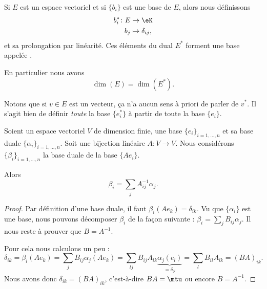 \begin{lemmaDef}      \label{DEFooTMSEooZFtsqa}
	Si \( E\) est un espace vectoriel et si \( \{ b_i \}\) est une base de \( E\), alors nous définissons
	\begin{equation}
		\begin{aligned}
			b_i^*\colon E & \to \eK              \\
			b_j           & \mapsto \delta_{ij},
		\end{aligned}
	\end{equation}
	et sa prolongation par linéarité. Ces éléments du dual \( E^*\) forment une base appelée .

	En particulier nous avons
	\begin{equation}
		\dim(E)=\dim(E^*).
	\end{equation}
\end{lemmaDef}
Notons que si \( v\in E\) est un vecteur, ça n'a aucun sens à priori de parler de \( v^*\). Il s'agit bien de définir \emph{toute} la base \( \{ e_i^* \}\) à partir de toute la base \( \{ e_i \}\).

\begin{lemma}		\label{LEMooSVRIooFbxfue}
	Soient un espace vectoriel \( V\) de dimension finie, une base \( \{ e_i \}_{i=1,\ldots,n}\) et sa base duale \( \{ \alpha_i \}_{i=1,\ldots,n}\). Soit une bijection linéaire \(A \colon V\to V  \). Nous considérons \( \{ \beta_i \}_{i=1,\ldots,n}\) la base duale de la base \( \{ Ae_i \}\).

	Alors
	\begin{equation}
		\beta_i=\sum_jA^{-1}_{ij}\alpha_j.
	\end{equation}
\end{lemma}

\begin{proof}

	Par définition d'une base duale, il faut \( \beta_i(Ae_k)=\delta_{ik}\). Vu que \( \{ \alpha_i \}\) est une base, nous pouvons décomposer \( \beta_i\) de la façon suivante : \( \beta_i=\sum_jB_{ij}\alpha_j\). Il nous reste à prouver que \( B=A^{-1}\).

	Pour cela nous calculons un peu :
	\begin{equation}
		\delta_{ik}=\beta_i(Ae_k)=\sum_jB_{ij}\alpha_j(Ae_k)=\sum_{lj}B_{ij}A_{lk}\underbrace{\alpha_j(e_l)}_{=\delta_{jl}}=\sum_lB_{il}A_{lk}=(BA)_{ik}.
	\end{equation}
	Nous avons donc \( \delta_{ik}=(BA)_{ik}\), c'est-à-dire \( BA=\mtu\) ou encore \( B=A^{-1}\).
\end{proof}

